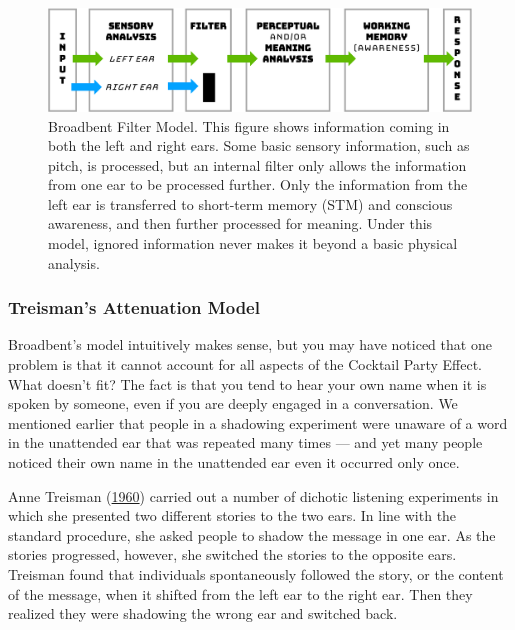 \documentclass[
]{krantz}
\begin{document}
\begin{figure}

{\centering \includegraphics[width=0.8\linewidth]{images/ch3/fig3} 

}

\caption{Broadbent Filter Model. This figure shows information coming in both the left and right ears. Some basic sensory information, such as pitch, is processed, but an internal filter only allows the information from one ear to be processed further. Only the information from the left ear is transferred to short-term memory (STM) and conscious awareness, and then further processed for meaning. Under this model, ignored information never makes it beyond a basic physical analysis.}\label{fig:broadbent}
\end{figure}

\hypertarget{treismans-attenuation-model}{%
\subsubsection*{Treisman's Attenuation Model}\label{treismans-attenuation-model}}


Broadbent's model intuitively makes sense, but you may have noticed that one problem is that it cannot account for all aspects of the Cocktail Party Effect. What doesn't fit? The fact is that you tend to hear your own name when it is spoken by someone, even if you are deeply engaged in a conversation. We mentioned earlier that people in a shadowing experiment were unaware of a word in the unattended ear that was repeated many times --- and yet many people noticed their own name in the unattended ear even it occurred only once.

Anne Treisman (\protect\hyperlink{ref-Treisman1960}{1960}) carried out a number of dichotic listening experiments in which she presented two different stories to the two ears. In line with the standard procedure, she asked people to shadow the message in one ear. As the stories progressed, however, she switched the stories to the opposite ears. Treisman found that individuals spontaneously followed the story, or the content of the message, when it shifted from the left ear to the right ear. Then they realized they were shadowing the wrong ear and switched back.
\end{document}
